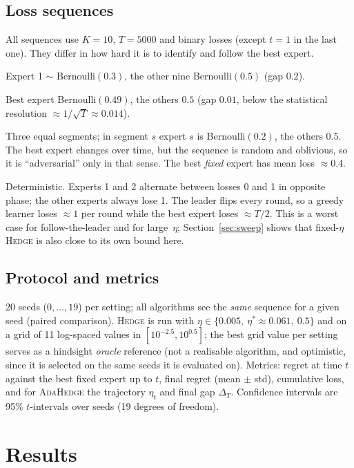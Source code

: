 \documentclass[11pt,a4paper]{article}
\newcommand{\Hedge}{\textsc{Hedge}}
\newcommand{\Ada}{\textsc{AdaHedge}}
\begin{document}
\subsection{Loss sequences}
All sequences use $K=10$, $T=5000$ and binary losses (except $t=1$ in the last one). They differ in how hard it is to identify and follow the best expert.
\begin{description}\setlength\itemsep{1pt}
\item[Stochastic.] Expert 1 $\sim$ Bernoulli$(0.3)$, the other nine Bernoulli$(0.5)$ (gap $0.2$).
\item[Low gap.] Best expert Bernoulli$(0.49)$, the others $0.5$ (gap $0.01$, below the statistical resolution $\approx1/\sqrt T\approx0.014$).
\item[Adversarial (switching).] Three equal segments; in segment $s$ expert $s$ is Bernoulli$(0.2)$, the others $0.5$. The best expert changes over time, but the sequence is random and oblivious, so it is ``adversarial'' only in that sense. The best \emph{fixed} expert has mean loss $\approx 0.4$.
\item[Alternating (extra).] Deterministic. Experts 1 and 2 alternate between losses 0 and 1 in opposite phase; the other experts always lose 1. The leader flips every round, so a greedy learner loses $\approx1$ per round while the best expert loses $\approx T/2$. This is a worst case for follow-the-leader and for large~$\eta$; Section~\ref{sec:sweep} shows that fixed-$\eta$ \Hedge{} is also close to its own bound here.
\end{description}

\subsection{Protocol and metrics}
20 seeds ($0,\dots,19$) per setting; all algorithms see the \emph{same} sequence for a given seed (paired comparison). \Hedge{} is run with $\eta\in\{0.005,\ \eta^*\approx0.061,\ 0.5\}$ and on a grid of 11 log-spaced values in $[10^{-2.5},10^{0.5}]$; the best grid value per setting serves as a hindsight \emph{oracle} reference (not a realisable algorithm, and optimistic, since it is selected on the same seeds it is evaluated on).
Metrics: regret at time $t$ against the best fixed expert up to $t$, final regret (mean $\pm$ std), cumulative loss, and for \Ada{} the trajectory $\eta_t$ and final gap $\Delta_T$.
Confidence intervals are 95\% $t$-intervals over seeds (19 degrees of freedom).

\section{Results}\label{sec:results}
\end{document}
